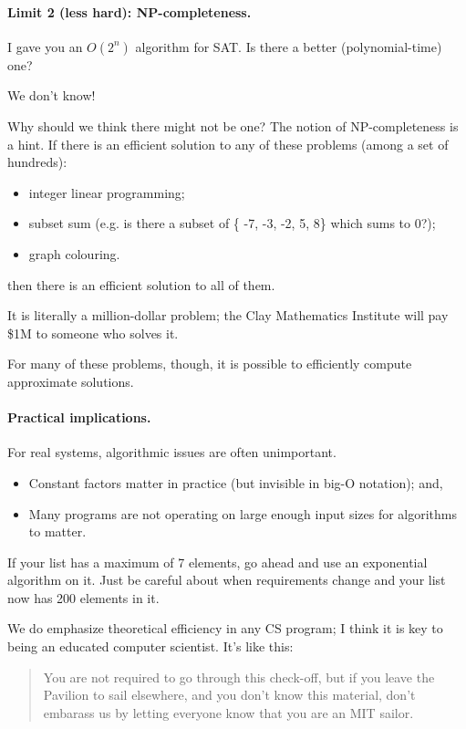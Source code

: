 \documentclass[11pt]{article}
\begin{document}
\paragraph{Limit 2 (less hard): NP-completeness.}
I gave you an $O(2^n)$ algorithm for SAT. Is there a better (polynomial-time) one?

\begin{center}
We don't know!
\end{center}

Why should we think there might not be one? The notion of NP-completeness is a hint.
If there is an efficient solution to any of these problems (among a set of hundreds):
\begin{itemize}
\item integer linear programming;
\item subset sum (e.g. is there a subset of \{ -7, -3, -2, 5, 8\} which sums to 0?);
\item graph colouring.
\end{itemize}
then there is an efficient solution to all of them.

It is literally a million-dollar problem; the Clay Mathematics Institute will pay \$1M
to someone who solves it. 

For many of these problems, though, it is possible to efficiently compute approximate solutions.

\paragraph{Practical implications.} For real systems, algorithmic issues are often 
unimportant.

\begin{itemize}
\item Constant factors matter in practice (but invisible in big-O notation); and,
\item Many programs are not operating on large enough input sizes for algorithms to matter.
\end{itemize}

If your list has a maximum of 7 elements, go ahead and use an exponential algorithm on it.
Just be careful about when requirements change and your list now has 200 elements in it.

We do emphasize theoretical efficiency in any CS program; I think it is key to being an educated computer
scientist. It's like this:

\begin{quote}
You are not required to go through this check-off, but if you leave the Pavilion to sail
elsewhere, and you don't know this material, don't embarass us by letting everyone know
that you are an MIT sailor.
\end{quote}
\end{document}
